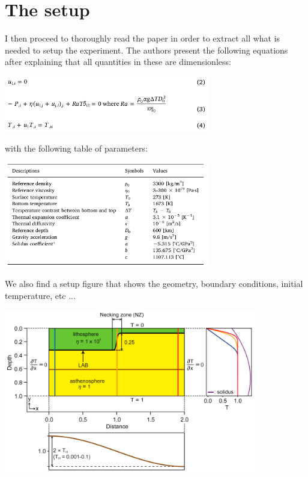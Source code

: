 \section*{The setup}

I then proceed to thoroughly read the paper in order to extract all what is needed to setup 
the experiment. 
The authors present the following equations after explaining that all quantities in these
are dimensionless:
\begin{center}
\includegraphics[width=9cm]{python_codes/fieldstone_168/images/kiso20c.png}
\end{center}
with the following table of parameters:
\begin{center}
\includegraphics[width=9cm]{python_codes/fieldstone_168/images/kiso20a.png}
\end{center}
We also find a setup figure that shows the geometry, 
boundary conditions, initial temperature, etc ...
\begin{center}
\includegraphics[width=11cm]{python_codes/fieldstone_168/images/kiso20b.png}
\end{center}

